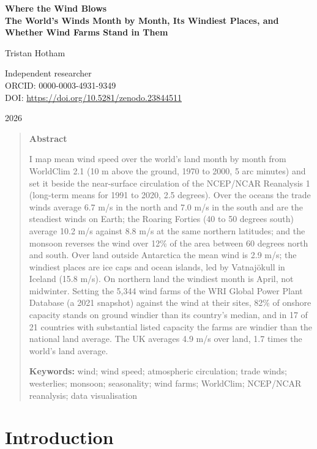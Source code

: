 \documentclass[11pt,a4paper]{article}
\begin{document}
\begin{center}
{\Large\bfseries Where the Wind Blows\\[2pt] The World's Winds Month by Month, Its Windiest Places, and Whether Wind Farms Stand in Them\par}
\vspace{1.2em}
{\large Tristan Hotham\par}
\vspace{0.3em}
{\small Independent researcher\\
ORCID: 0000-0003-4931-9349\\
DOI: \href{https://doi.org/10.5281/zenodo.23844511}{https://doi.org/10.5281/zenodo.23844511}\par}
\vspace{0.8em}
2026
\end{center}

\begin{quote}
\small
\begin{center}\textbf{Abstract}\end{center}
I map mean wind speed over the world's land month by month from WorldClim 2.1 (10 m above the ground, 1970 to 2000, 5 arc minutes) and set it beside the near-surface circulation of the NCEP/NCAR Reanalysis 1 (long-term means for 1991 to 2020, 2.5 degrees). Over the oceans the trade winds average 6.7 m/s in the north and 7.0 m/s in the south and are the steadiest winds on Earth; the Roaring Forties (40 to 50 degrees south) average 10.2 m/s against 8.8 m/s at the same northern latitudes; and the monsoon reverses the wind over 12\% of the area between 60 degrees north and south. Over land outside Antarctica the mean wind is 2.9 m/s; the windiest places are ice caps and ocean islands, led by Vatnajökull in Iceland (15.8 m/s). On northern land the windiest month is April, not midwinter. Setting the 5,344 wind farms of the WRI Global Power Plant Database (a 2021 snapshot) against the wind at their sites, 82\% of onshore capacity stands on ground windier than its country's median, and in 17 of 21 countries with substantial listed capacity the farms are windier than the national land average. The UK averages 4.9 m/s over land, 1.7 times the world's land average.

\textbf{Keywords:} wind; wind speed; atmospheric circulation; trade winds; westerlies; monsoon; seasonality; wind farms; WorldClim; NCEP/NCAR reanalysis; data visualisation
\end{quote}

\section{Introduction}
\end{document}
